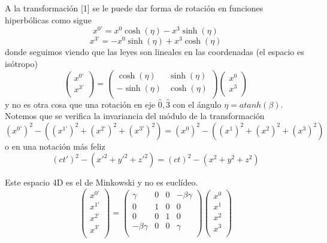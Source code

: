 \documentclass[10pt,oneside]{CBFT_book}
\begin{document}
A la transformación [1] se le puede dar forma de rotación en funciones hiperbólicas como sigue
\[
	x^{0'} = x^0 \cosh( \eta ) - x^3 \sinh( \eta )
\]
\[
	x^{3'} = -x^0 \sinh( \eta ) + x^3 \cosh( \eta )
\]
donde seguimos viendo que las leyes son lineales en las coordenadas (el espacio es isótropo)
\[
	\begin{pmatrix}
	 x^{0'} \\
	 x^{3'} \\
	\end{pmatrix}
	=
	\begin{pmatrix}
	\cosh( \eta ) & \sinh( \eta ) \\
	-\sinh( \eta ) & \cosh( \eta ) \\
	\end{pmatrix}
	\begin{pmatrix}
	 x^{0} \\
	 x^{3} \\
	\end{pmatrix}
\]
y no es otra cosa  que una rotación en eje $\hat{0}, \hat{3}$ con el ángulo $\eta = atanh( \beta )$. Notemos
que se verifica la invariancia del módulo de la transformación
\[
	(x^{0'})^2 -  ( (x^{1'})^2  + (x^{2'})^2 + (x^{3'})^2 ) =
		(x^{0})^2 -  ( (x^{1})^2  + (x^{2})^2 + (x^{3})^2 ) 
\]
o en una notación más feliz
\[
	(ct')^2 - ( x'^2 + y'^2 + z'^2 ) = (ct)^2 - ( x^2 + y^2 + z^2 )
\]
	
Este espacio 4D es el de Minkowski y no es euclídeo.
\[
	\begin{pmatrix}
	 x^{0'} \\
	 x^{1'} \\
	 x^{2'} \\
	 x^{3'} \\
	\end{pmatrix}
	=
	\begin{pmatrix}
	\gamma & 0 & 0 & -\beta\gamma \\
	0 & 1 & 0 & 0 \\
	0 & 0 & 1 & 0\\
	-\beta\gamma  & 0 & 0 & \gamma \\
	\end{pmatrix}
	\begin{pmatrix}
	 x^{0} \\
	 x^{1} \\
	 x^{2} \\
	 x^{3} \\
	\end{pmatrix}
\]
\end{document}
